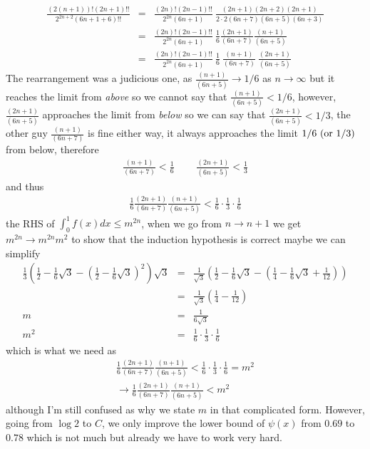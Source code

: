 \documentclass[aps,preprint,preprintnumbers,nofootinbib,showpacs,prd]{revtex4-1}
\newcommand{\nbea}{\begin{eqnarray*}}
\newcommand{\neea}{\end{eqnarray*}}
\begin{document}
%
\nbea
\frac{(2(n+1))!(2n + 1)!!}{2^{2n+2} (6n + 1 + 6)!!} & = & \frac{(2n)!(2n-1)!!}{2^{2n}(6n + 1)} ~ \frac{(2n+1)(2n+2)(2n+1)}{2\cdot2 (6n + 7) (6n + 5) (6n + 3)} \\
& = & \frac{(2n)!(2n-1)!!}{2^{2n}(6n + 1)} ~ \frac{1}{6}\frac{(2n+1)}{(6n + 7)} \frac{(n+1)}{(6n + 5)} \\
& = & \frac{(2n)!(2n-1)!!}{2^{2n}(6n + 1)} ~ \frac{1}{6}~\frac{(n+1)}{(6n + 7)} ~ \frac{(2n+1)}{(6n + 5)}
\neea
%
The rearrangement was a judicious one, as $\frac{(n+1)}{(6n + 5)} \to 1/6$ as $n\to\infty$ but it reaches the limit from {\it above} so we cannot say that $\frac{(n+1)}{(6n + 5)} < 1/6$, however, $\frac{(2n+1)}{(6n + 5)}$ approaches the limit from {\it below} so we can say that $\frac{(2n+1)}{(6n + 5)} < 1/3$, the other guy $\frac{(n+1)}{(6n + 7)}$ is fine either way, it always approaches the limit $1/6 ~({\rm or~} 1/3)$ from below, therefore
%
\nbea
\frac{(n+1)}{(6n + 7)} < \frac{1}{6} ~~~~~ ~~~~~ \frac{(2n+1)}{(6n + 5)} < \frac{1}{3}
\neea
%
and thus
%
\nbea
\frac{1}{6}\frac{(2n+1)}{(6n + 7)} \frac{(n+1)}{(6n + 5)} < \frac{1}{6}\cdot\frac{1}{3}\cdot\frac{1}{6}
\neea
%
the RHS of $\int_0^1 f(x) dx \le m^{2n}$, when we go from $n\to n+1$ we get $m^{2n}\to m^{2n}m^2$ to show that the induction hypothesis is correct maybe we can simplify
%
\nbea
\frac{1}{3} \left( \frac{1}{2} - \frac{1}{6}\sqrt{3} - \left( \frac{1}{2} - \frac{1}{6}\sqrt{3} \right )^2 \right ) \sqrt{3} & = & \frac{1}{\sqrt{3}} \left( \frac{1}{2} - \frac{1}{6}\sqrt{3} - \left( \frac{1}{4} - \frac{1}{6}\sqrt{3}  + \frac{1}{12} \right ) \right ) \\ 
& = & \frac{1}{\sqrt{3}} \left( \frac{1}{4} - \frac{1}{12} \right ) \\ 
m & = & \frac{1}{6\sqrt{3}} \\
m^2 & = & \frac{1}{6}\cdot\frac{1}{3}\cdot\frac{1}{6}
\neea
%
which is what we need as
%
\nbea
\frac{1}{6}\frac{(2n+1)}{(6n + 7)} \frac{(n+1)}{(6n + 5)} < \frac{1}{6}\cdot\frac{1}{3}\cdot\frac{1}{6} = m^2 \\
\to \frac{1}{6}\frac{(2n+1)}{(6n + 7)} \frac{(n+1)}{(6n + 5)} < m^2
\neea
%
although I'm still confused as why we state $m$ in that complicated form. However, going from $\log 2$ to $C$, we only improve the lower bound of $\psi(x)$ from $0.69$ to $0.78$ which is not much but already we have to work very hard.
\end{document}
